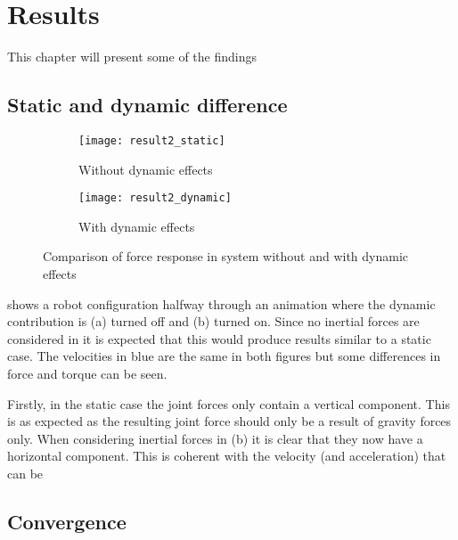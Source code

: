 \chapter{Results}

This chapter will present some of the findings 


\section{Static and dynamic difference}

\begin{figure}[h!]
\begin{subfigure}[b]{0.5\textwidth}
    \centering
    \texttt{[image: result2\_static]}
    \caption{Without dynamic effects}
    \label{result_static}
\end{subfigure}
\hfill
\begin{subfigure}[b]{0.5\textwidth}
    \centering
    \texttt{[image: result2\_dynamic]}
    \caption{With dynamic effects}
\end{subfigure}
\caption{Comparison of force response in system without and with dynamic effects}
\label{result_img}
\end{figure}

 shows a robot configuration halfway through an animation where the dynamic contribution is (a) turned off and (b) turned on. Since no inertial forces are considered in  it is expected that this would produce results similar to a static case. The velocities in blue are the same in both figures but some differences in force and torque can be seen.

Firstly, in the static case the joint forces only contain a vertical component. This is as expected as the resulting joint force should only be a result of gravity forces only. When considering inertial forces in (b) it is clear that they now have a horizontal component. This is coherent with the velocity (and acceleration) that can be


\section{Convergence}


